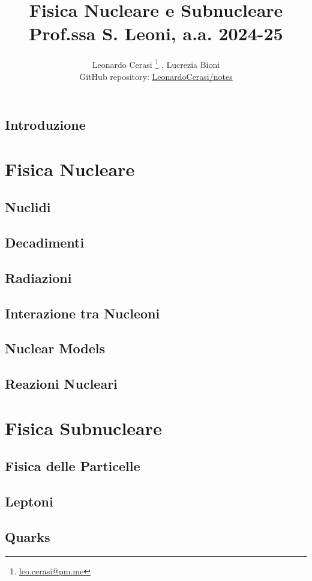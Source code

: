 \documentclass[a4paper, 12pt, openany]{book}
\author{Leonardo Cerasi%
	\thanks{\scriptsize\href{mailto:leonardo.cerasi@studenti.unimi.it}{leo.cerasi@pm.me}}%
	, Lucrezia Bioni\\
	\small GitHub repository: \href{https://github.com/LeonardoCerasi/notes}{LeonardoCerasi/notes}}
\title{\Huge\textbf{Fisica Nucleare e Subnucleare} \\ \large Prof.ssa S. Leoni, a.a. 2024-25}
\begin{document}
\frontmatter

\maketitle

\tableofcontents
\pagestyle{indice}

\mainmatter

\chapter*{Introduzione}
\pagestyle{introd}


\part{Fisica Nucleare}
\pagestyle{body}

\chapter{Nuclidi}
\pagestyle{body}


\chapter{Decadimenti}
\pagestyle{body}


\chapter{Radiazioni}
\pagestyle{body}


\chapter{Interazione tra Nucleoni}
\pagestyle{body}


\chapter{Nuclear Models}
\pagestyle{body}


\chapter{Reazioni Nucleari}
\pagestyle{body}


\part{Fisica Subnucleare}
\pagestyle{body}

\chapter{Fisica delle Particelle}


\chapter{Leptoni}


\chapter{Quarks}

\end{document}
